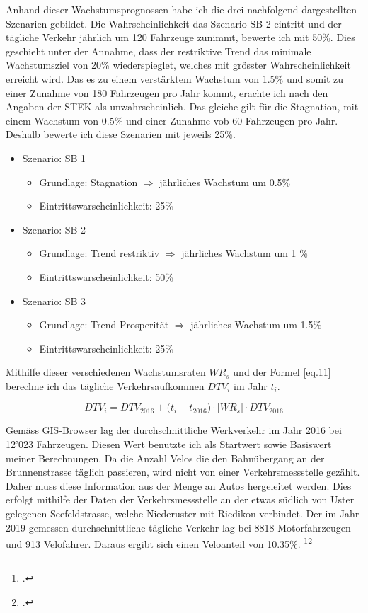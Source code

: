 Anhand dieser Wachstumsprognossen habe ich die drei nachfolgend dargestellten Szenarien gebildet. 
Die Wahrscheinlichkeit das Szenario SB 2 eintritt und der tägliche Verkehr jährlich um 120 Fahrzeuge zunimmt, bewerte ich mit 50\%. Dies geschieht unter der Annahme, dass der restriktive Trend das minimale Wachstumsziel von 20\% wiederspieglet, welches mit grösster Wahrscheinlichkeit erreicht wird. 
Das es zu einem verstärktem Wachstum von 1.5\% und somit zu einer Zunahme von 180 Fahrzeugen pro Jahr kommt, erachte ich nach den Angaben der STEK als unwahrscheinlich. Das gleiche gilt für die Stagnation, mit einem Wachstum von 0.5\% und einer Zunahme vob 60 Fahrzeugen pro Jahr. Deshalb bewerte ich diese Szenarien mit jeweils 25\%.

\begin{itemize}
\item Szenario: SB 1
	\begin{itemize}
	\item Grundlage: Stagnation $\Rightarrow$ jährliches Wachstum um 0.5\%
	\item Eintrittswarscheinlichkeit: 25\%
	\end{itemize}
\item Szenario: SB 2
	\begin{itemize}
	\item Grundlage: Trend restriktiv  $\Rightarrow$ jährliches Wachstum um 1 \%
	\item Eintrittswarscheinlichkeit: 50\%
	\end{itemize}
\item Szenario: SB 3
	\begin{itemize}
	\item Grundlage: Trend Prosperität  $\Rightarrow$ jährliches Wachstum um 1.5\%
	\item Eintrittswarscheinlichkeit: 25\%
	\end{itemize}
\end{itemize}

Mithilfe dieser verschiedenen Wachstumsraten $WR_{s}$ und der Formel \ref{eq.11} berechne ich das tägliche Verkehrsaufkommen $DTV_{i}$ im Jahr $t_{i}$.

\begin{equation*}
DTV_{i} = DTV_{2016} + \bigl( t_{i} - t_{2016} \bigr) \cdot \bigl[WR_{s}\bigr] \cdot DTV_{2016}
\label{eq.11}
\end{equation*}

Gemäss GIS-Browser lag der durchschnittliche Werkverkehr im Jahr 2016 bei 12'023 Fahrzeugen. Diesen Wert benutzte ich als Startwert sowie Basiswert meiner Berechnungen.
Da die Anzahl Velos die den Bahnübergang an der Brunnenstrasse täglich passieren, wird nicht von einer Verkehrsmessstelle gezählt. Daher muss diese Information aus der Menge an Autos hergeleitet werden. Dies erfolgt mithilfe der Daten der Verkehrsmessstelle an der etwas südlich von Uster gelegenen Seefeldstrasse, welche Niederuster mit Riedikon verbindet. 
Der im Jahr 2019 gemessen durchschnittliche tägliche Verkehr lag bei 8818 Motorfahrzeugen und 913 Velofahrer. Daraus ergibt sich einen Veloanteil von 10.35\%. \footcite{MIVSeefeld}\footcite{VeloSeefeld}

